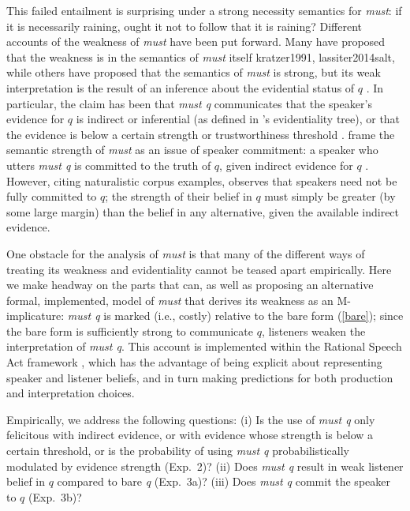 \documentclass[11pt]{article}
\newcommand{\red}[1]{\textcolor{Red}{#1}}
\begin{document}
This failed entailment is surprising under a strong necessity semantics for \emph{must}: if it is necessarily raining, ought it not to follow that it is raining? Different accounts of the weakness of \emph{must} have been put forward. Many have proposed that the weakness is in the semantics of \emph{must} itself {kratzer1991, lassiter2014salt}, while others have proposed that the semantics of \emph{must} is strong, but its weak interpretation is the result of an inference about the evidential status of $q$ \citep{vonfintelgillies2010}. In particular, the claim has been that \emph{must q} communicates that the speaker's evidence for $q$ is indirect or inferential (as defined in \citep{willett1988}'s evidentiality tree), or that the evidence is below a certain strength or trustworthiness threshold \citep{matthewson2015}. \citep{vonfintelgillies2010} frame the semantic strength of \emph{must} as an issue of speaker commitment: a speaker who utters \emph{must q} is committed to the truth of $q$, given indirect evidence for $q$ \citep{vonfintelgillies2010}. However, citing naturalistic corpus examples, \citep{lassiter2014salt} observes that speakers need not be fully committed to $q$; the strength of their belief in $q$ must simply be greater (by some large margin) than the belief in any alternative, given the available indirect evidence.

One obstacle for the analysis of \emph{must} is that many of the different ways of treating its weakness and evidentiality cannot be teased apart empirically. Here we make headway on the parts that can, as well as proposing an alternative formal, implemented, model of \emph{must} that derives its weakness as an M-implicature: \emph{must q} is marked (i.e., costly) relative to the bare form (\ref{bare}); since the bare form is sufficiently strong to communicate $q$, listeners weaken the interpretation of \emph{must q}. This account is implemented within the Rational Speech Act framework \citep{frank2012, goodmanstuhlmueller2013}, which has the advantage of being explicit about representing speaker and listener beliefs, and in turn making predictions for both production and  interpretation choices.

Empirically, we address the following questions: (i) Is the use of \emph{must q} only felicitous with indirect evidence, or with evidence whose strength is below a certain threshold, or is the probability of using \emph{must q} probabilistically modulated by evidence strength (Exp.~2)? (ii) Does \emph{must q} result in weak listener belief in $q$ compared to bare \emph{q} (Exp.~3a)? (iii) Does \emph{must q} commit the speaker to $q$ (Exp.~3b)? %
\end{document}
